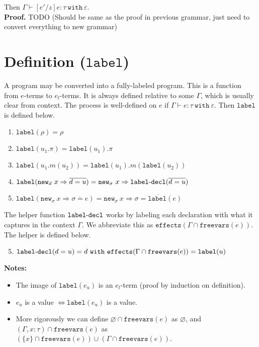 \documentclass{llncs}
\newcommand{\keywadj}[1]{\mathtt{#1}}
\newcommand{\keyw}[1]{\keywadj{#1}~}
\newcommand{\kw}[1]{\keyw{ #1 }}
\newcommand{\kwa}[1]{\keywadj{ #1 }}
\newcommand{\hyphen}{\hbox{-}}
\newcommand{\type}[2]{
	#1~\keyw{with} #2
}
\newcommand{\newd}[0]{
	\keywadj{new}_d~x \Rightarrow \overline{d = u}
}
\begin{document}
	\noindent
Then $\Gamma \vdash [e'/z]e : \tau~\keyw{with} \varepsilon$.\\

\noindent
\textbf{Proof.} TODO (Should be same as the proof in previous grammar, just need to convert everything to new grammar)






\section{Definition ($\keywadj{label}$)}
A program may be converted into a fully-labeled program. This is a function from $e$-terms to $e_l$-terms. It is always defined relative to some $\Gamma$, which is usually clear from context. The process is well-defined on $e$ if $\Gamma \vdash e : \type{\tau}{\varepsilon}$. Then $\kwa{label}$ is defined below.

\begin{enumerate}
	\item $\kwa{label}(\rho) = \rho$
	\item $\kwa{label}(u_1.\pi) = \kwa{label}(u_1).\pi$
	\item $\kwa{label}(u_1.m(u_2)) = \kwa{label}(u_1).m(\kwa{label}(u_2))$
	\item $\kwa{label}(\newd) = \kwa{new}_\sigma~x \Rightarrow \kwa{label \hyphen decl}(\overline{d = u})$
	\item $\kwa{label}(\kwa{new}_\sigma~x \Rightarrow \overline{\sigma = e}) = \kwa{new}_\sigma~x \Rightarrow \overline{\sigma = \kwa{label}(e)}$
\end{enumerate}

\noindent
The helper function $\kwa{label \hyphen decl}$ works by labeling each declaration with what it captures in the context $\Gamma$. We abbreviate this as $\kwa{effects}(\Gamma \cap \kwa{freevars}(e))$. The helper is defined below.

\begin{enumerate}
  \setcounter{enumi}{4}
  \item $\kwa{label \hyphen decl}(d = u) = d~\kw{with} \kwa{effects}(\Gamma \cap \kwa{freevars}(e)) = \kwa{label}(u)$
\end{enumerate}

\noindent \textbf{Notes:}
\begin{itemize}
	\item The image of $\kwa{label}(e_u)$ is an $e_l$-term (proof by induction on definition).
	\item $e_u$ is a value $\iff \kwa{label}(e_u)$ is a value.
	\item More rigorously we can define $\varnothing \cap \kwa{freevars}(e)$ as $\varnothing$, and $(\Gamma, x : \tau) \cap \kwa{freevars}(e)$ as $(\{ x \} \cap \kwa{freevars}(e)) \cup (\Gamma \cap \kwa{freevars}(e))$.
\end{itemize}
\end{document}
